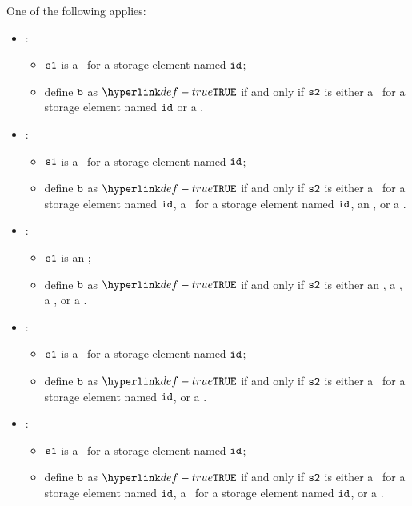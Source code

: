 \ProseParagraph
One of the following applies:
\begin{itemize}
    \item {}:
    \begin{itemize}
        \item $\texttt{s1}$ is a \ReadGlobalTerm\ for a storage element named $\texttt{id}$;
        \item define $\texttt{b}$ as $\True$ if and only if $\texttt{s2}$ is either
              a \WriteGlobalTerm\ for a storage element named $\texttt{id}$ or a \RecursiveCallTerm.
    \end{itemize}

    \item {}:
    \begin{itemize}
        \item $\texttt{s1}$ is a \WriteGlobalTerm\ for a storage element named $\texttt{id}$;
        \item define $\texttt{b}$ as $\True$ if and only if $\texttt{s2}$ is either
              a \WriteGlobalTerm\ for a storage element named $\texttt{id}$,
              a \ReadGlobalTerm\ for a storage element named $\texttt{id}$,
              an \ThrowExceptionTerm, or
              a \RecursiveCallTerm.
    \end{itemize}

    \item {}:
    \begin{itemize}
        \item $\texttt{s1}$ is an \ThrowExceptionTerm;
        \item define $\texttt{b}$ as $\True$ if and only if $\texttt{s2}$ is either
                an \ThrowExceptionTerm,
                a \WriteLocalTerm,
                a \PerformsAssertionsTerm, or a
                \RecursiveCallTerm.
    \end{itemize}

    \item {}:
    \begin{itemize}
        \item $\texttt{s1}$ is a \ReadLocalTerm\ for a storage element named $\texttt{id}$;
        \item define $\texttt{b}$ as $\True$ if and only if $\texttt{s2}$ is either
                a \WriteLocalTerm\ for a storage element named $\texttt{id}$, or a
                \RecursiveCallTerm.
    \end{itemize}

    \item {}:
    \begin{itemize}
        \item $\texttt{s1}$ is a \WriteLocalTerm\ for a storage element named $\texttt{id}$;
        \item define $\texttt{b}$ as $\True$ if and only if $\texttt{s2}$ is either
              a \ReadLocalTerm\ for a storage element named $\texttt{id}$,
              a \WriteLocalTerm\ for a storage element named $\texttt{id}$, or a
                \RecursiveCallTerm.
    \end{itemize}


\end{itemize}
